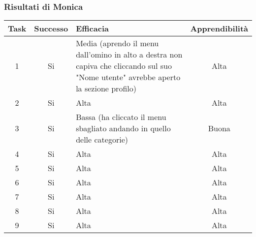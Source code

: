 \documentclass[../Report.tex]{subfiles}
\begin{document}
    \subsubsection{Risultati di Monica}
    \begin{table}[H]
        \begin{tabular}{|c|c|p{5cm}|c|}
            \hline
            Task & Successo & Efficacia & Apprendibilità \\
            \hline
            1 & Si & Media (aprendo il menu dall'omino in alto a destra non capiva che cliccando sul suo "Nome utente" avrebbe aperto la sezione profilo) & Alta \\
            \hline
            2 & Si & Alta & Alta  \\
            \hline
            3 & Si & Bassa (ha cliccato il menu sbagliato andando in quello delle categorie)  & Buona  \\
            \hline
            4 & Si & Alta & Alta  \\
            \hline
            5 & Si & Alta & Alta  \\
            \hline
            6 & Si & Alta & Alta  \\
            \hline
            7 & Si & Alta & Alta  \\
            \hline
            8 & Si & Alta & Alta  \\
            \hline
            9 & Si & Alta & Alta  \\
            \hline
        \end{tabular}

        
    \end{table}
\end{document}
